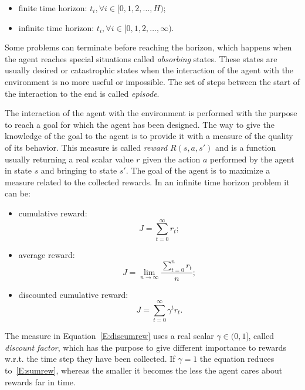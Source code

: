 \begin{itemize}
 \item finite time horizon: $t_i, \forall i \in [0, 1, 2, \dots, H)$;
 \item infinite time horizon: $t_i, \forall i \in [0, 1, 2, \dots, \infty)$.
\end{itemize}
Some problems can terminate before reaching the horizon, which happens when the agent reaches special situations called \textit{absorbing} states. These states are usually desired or catastrophic states when the interaction of the agent with the environment is no more useful or impossible. The set of steps between the start of the interaction to the end is called \textit{episode}.

The interaction of the agent with the environment is performed with the purpose to reach a goal for which the agent has been designed. The way to give the knowledge of the goal to the agent is to provide it with a measure of the quality of its behavior. This measure is called \textit{reward} $R(s,a,s')$ and is a function usually returning a real scalar value $r$ given the action $a$ performed by the agent in state $s$ and bringing to state $s'$. The goal of the agent is to maximize a measure related to the collected rewards. In an infinite time horizon problem it can be:
\begin{itemize}
 \item cumulative reward:
 \begin{equation}\label{E:sumrew}
  J = \sum_{t=0}^\infty r_t;
 \end{equation}
\item average reward:
\begin{equation}
 J = \lim_{n\to\infty}\dfrac{\sum_{t=0}^n r_t}{n};
\end{equation}
\item discounted cumulative reward:
\begin{equation}\label{E:discumrew}
 J = \sum_{t=0}^\infty \gamma^t r_t.
\end{equation}
\end{itemize}
The measure in Equation~\ref{E:discumrew} uses a real scalar $\gamma \in (0, 1]$, called \textit{discount factor}, which has the purpose to give different importance to rewards w.r.t. the time step they have been collected. If $\gamma = 1$ the equation reduces to~\ref{E:sumrew}, whereas the smaller it becomes the less the agent cares about rewards far in time.

